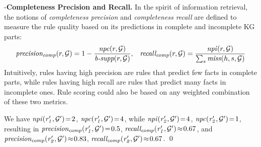 \noindent -\textbf{Completeness Precision and Recall.} In the spirit of information retrieval, the notions of \emph{completeness precision} and \emph{completeness recall} are defined to measure the rule quality based on its predictions in complete and incomplete KG parts:
\begin{align*}
\mathit{precision_{comp}}(r,\mathcal{G})=1-\frac{\mathit{npc}(r,\mathcal{G})}{\textit{b-supp}(r,\mathcal{G})},\;\;\;
\mathit{recall_{comp}}(r,\mathcal{G})=\frac{\mathit{npi}(r,\mathcal{G})}{\sum_s \mathit{miss}(h,s,\mathcal{G})}
\end{align*}
Intuitively, rules having high precision are rules that predict few facts in complete parts, while rules having high recall are rules that predict many facts in incomplete ones. Rule scoring could also be based on any weighted combination of these two metrics.
\begin{example}
We have $\mathit{npi(r_1', \mathcal{G}')}\!=\!2$, $\mathit{npc(r_1', \mathcal{G}')}\!=\!4$, while $\mathit{npi(r_2',\mathcal{G}')}\!=\!4$, $\mathit{npc(r_2',\mathcal{G}')}\!=\!1$, resulting in $\mathit{precision_{comp}(r_1',\mathcal{G}')}\!=\!0.5$, $\mathit{recall_{comp}(r_1',\mathcal{G}')}\!\approx\!0.67$, and $\mathit{precision_{comp}(r_2',\mathcal{G}')}\!\approx\!0.83$, $\mathit{recall_{comp}(r_2',\mathcal{G}')}\!\approx\!0.67$.
\qed
\end{example}

